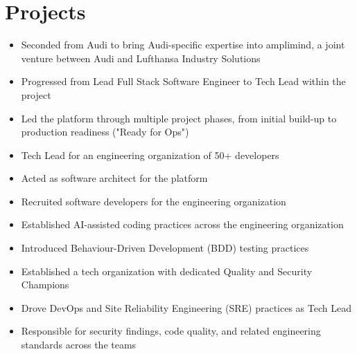 \documentclass[]{project-reference}
\begin{document}
\hspace{5cm}
\vspace{0.4cm}

\section{Projects}



\begin{itemize}
  \item Seconded from Audi to bring Audi-specific expertise into amplimind, a joint venture between Audi and Lufthansa Industry Solutions
  \item Progressed from Lead Full Stack Software Engineer to Tech Lead within the project
  \item Led the platform through multiple project phases, from initial build-up to production readiness ("Ready for Ops")
  \item Tech Lead for an engineering organization of 50+ developers
  \item Acted as software architect for the platform
  \item Recruited software developers for the engineering organization
  \item Established AI-assisted coding practices across the engineering organization
  \item Introduced Behaviour-Driven Development (BDD) testing practices
  \item Established a tech organization with dedicated Quality and Security Champions
  \item Drove DevOps and Site Reliability Engineering (SRE) practices as Tech Lead
  \item Responsible for security findings, code quality, and related engineering standards across the teams
\end{itemize}
\end{document}

